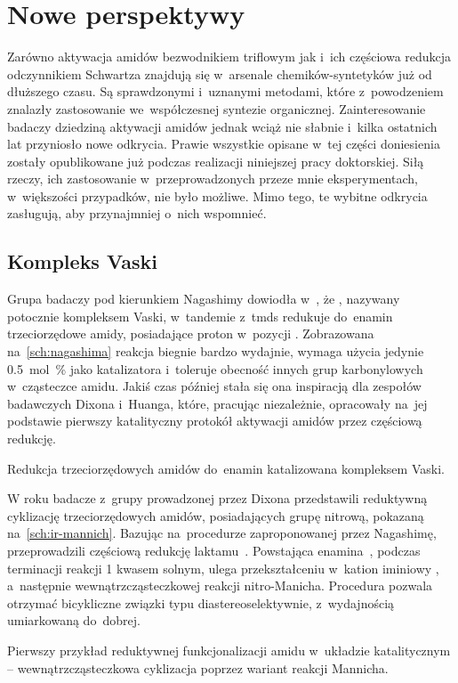 \section{Nowe perspektywy}\label{literature:new}
Zarówno aktywacja amidów bezwodnikiem triflowym jak i~ich częściowa redukcja odczynnikiem
  Schwartza znajdują się w~arsenale chemików-syntetyków już od dłuższego czasu.
Są sprawdzonymi i~uznanymi metodami, które z~powodzeniem znalazły zastosowanie
  we~współczesnej syntezie organicznej.
Zainteresowanie badaczy dziedziną aktywacji amidów jednak wciąż nie słabnie i~kilka
  ostatnich lat przyniosło nowe odkrycia.
Prawie wszystkie opisane w~tej części doniesienia zostały opublikowane już podczas
  realizacji niniejszej pracy doktorskiej.
Siłą rzeczy, ich zastosowanie w~przeprowadzonych przeze mnie eksperymentach, w~większości
  przypadków, nie było możliwe.
Mimo tego, te wybitne odkrycia zasługują, aby przynajmniej o~nich wspomnieć.

\subsection{Kompleks Vaski}\label{literature:new:vasca}
Grupa badaczy pod kierunkiem Nagashimy dowiodła w~\citeyear{motoyama09}, że \vaska{}, nazywany
  potocznie kompleksem Vaski, w~tandemie z~\gls{tmds} redukuje do~enamin 
  trzeciorzędowe amidy, posiadające proton w~pozycji
  \textalpha{}.
Zobrazowana na~\cref{sch:nagashima} reakcja biegnie bardzo wydajnie, wymaga użycia jedynie
  \SI{0.5}{\mole\percent} \vaska{} jako katalizatora i~toleruje obecność innych grup
  karbonylowych w~cząsteczce amidu.
Jakiś czas później stała się ona inspiracją dla zespołów badawczych Dixona i~Huanga, które,
  pracując niezależnie, opracowały na~jej podstawie pierwszy katalityczny protokół aktywacji
  amidów przez częściową redukcję.
\begin{marginscheme}
  
  \caption{Redukcja trzeciorzędowych amidów do~enamin katalizowana kompleksem Vaski.}
  \label{sch:nagashima}
\end{marginscheme}

W roku \citeyear{gregory15} badacze z~grupy prowadzonej przez Dixona przedstawili reduktywną
  cyklizację trzeciorzędowych amidów, posiadających grupę nitrową,
  pokazaną na~\cref{sch:ir-mannich}.
Bazując na~procedurze zaproponowanej przez Nagashimę, przeprowadzili częściową redukcję
  laktamu~.
Powstająca enamina~, podczas terminacji reakcji \SI{1}{\Molar} kwasem solnym,
  ulega przekształceniu w~kation iminiowy , a~następnie wewnątrzcząsteczkowej
  reakcji nitro-Manicha.
Procedura pozwala otrzymać bicykliczne związki typu  diastereoselektywnie,
  z~wydajnością umiarkowaną do~dobrej.
\begin{scheme*}
  
  \caption{
    Pierwszy przykład reduktywnej funkcjonalizacji amidu w~układzie katalitycznym \---
      wewnątrzcząsteczkowa cyklizacja poprzez wariant reakcji Mannicha.
  }
  \label{sch:ir-mannich}
\end{scheme*}

